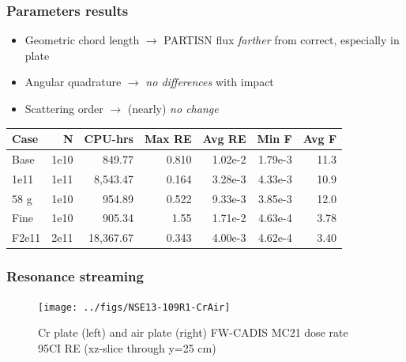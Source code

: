 \documentclass[xcolor=x11names,compress, handout]{beamer}
\renewcommand{\(}{\begin{columns}}
\renewcommand{\)}{\end{columns}}
\newcommand{\<}[1]{\begin{column}{#1}}
\renewcommand{\>}{\end{column}}
\begin{document}
\begin{frame}[fragile]
  \frametitle{Parameters results}
  
  	\begin{itemize}
  	\item Geometric chord length $\rightarrow$ PARTISN flux \textit{farther} from correct, especially in plate
  	\item Angular quadrature $\rightarrow$ \textit{no differences} with impact
	\item Scattering order $\rightarrow$ (nearly) \textit{no change}
  	\end{itemize}
  	\pause
  \begin{center}
    \begin{tabu}{|l|r|r|r|r|r|r|}\hline
      Case & N & CPU-hrs & Max RE & Avg RE & Min F & Avg F\\\hline
Base      & 1e10 & 849.77    & 0.810 & 1.02e-2 & 1.79e-3 & 11.3\\
%
1e11 & 1e11 & 8,543.47  & 0.164 & 3.28e-3 & \alert{4.33e-3} & 10.9\\
%
58 g & 1e10 & 954.89    & 0.522 & 9.33e-3 & \alert{3.85e-3} & 12.0\\
%
Fine & 1e10 & 905.34    & 1.55  & 1.71e-2 & 4.63e-4 & 3.78\\
%
F2e11 & 2e11 & 18,367.67 & 0.343 & 4.00e-3 & 4.62e-4 & 3.40\\\hline
    \end{tabu}
  \end{center}

\end{frame}


\begin{frame}[fragile]
  \frametitle{Resonance streaming}
   \begin{figure}[p]
   \begin{center}
     \texttt{[image: ../figs/NSE13-109R1-CrAir]}
   \end{center}
   \caption{Cr plate (left) and air plate (right) FW-CADIS MC21 dose rate 95CI RE (xz-slice through y=25 cm)}
   \label{fig:CrAir}
 \end{figure}
\end{frame}
\end{document}
